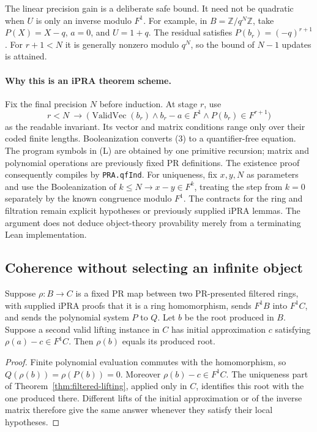 The linear precision gain is a deliberate safe bound.  It need not be
quadratic when $U$ is only an inverse modulo $F^1$.  For example, in
$B=\mathbb Z/q^N\mathbb Z$, take $P(X)=X-q$, $a=0$, and $U=1+q$.
The residual satisfies $P(b_r)=(-q)^{r+1}$.  For $r+1<N$ it is generally
nonzero modulo $q^N$, so the bound of $N-1$ updates is attained.

\paragraph{Why this is an iPRA theorem scheme.}
Fix the final precision $N$ before induction.  At stage $r$, use
\[
 r<N\ \longrightarrow\
 \bigl(\operatorname{ValidVec}(b_r)\wedge
       b_r-a\in F^1\wedge P(b_r)\in F^{r+1}\bigr)
                                                               \tag{3}
\]
as the readable invariant.  Its vector and matrix conditions range only
over their coded finite lengths.  Booleanization converts (3) to a
quantifier-free equation.  The program symbols in (L) are obtained by one
primitive recursion; matrix and polynomial operations are previously fixed
PR definitions.  The existence proof consequently compiles by
\texttt{PRA.qfInd}.  For uniqueness, fix $x,y,N$ as parameters and use the
Booleanization of $k\le N\to x-y\in F^k$, treating the step from
$k=0$ separately by the known congruence modulo $F^1$.
The contracts for the ring and
filtration remain explicit hypotheses or previously supplied iPRA lemmas.
The argument does not deduce object-theory provability merely from a
terminating Lean implementation.

\subsection{Coherence without selecting an infinite object}

\begin{corollary}
\label{cor:filtered-coherence}
Suppose $\rho:B\to C$ is a fixed PR map between two PR-presented
filtered rings, with supplied iPRA proofs that it is a ring homomorphism,
sends $F^1B$ into $F^1C$, and sends the polynomial system
$P$ to $Q$.  Let $b$ be the root produced in $B$.  Suppose a second valid
lifting instance in $C$ has initial approximation $c$ satisfying
$\rho(a)-c\in F^1C$.  Then $\rho(b)$ equals its produced root.
\end{corollary}

\begin{proof}
Finite polynomial evaluation commutes with the homomorphism, so
$Q(\rho(b))=\rho(P(b))=0$.  Moreover $\rho(b)-c\in F^1C$.
The uniqueness part of Theorem~\ref{thm:filtered-lifting}, applied only in
$C$, identifies this root with the one produced there.  Different lifts
of the initial approximation or of the inverse matrix therefore give the
same answer whenever they satisfy their local hypotheses.
\end{proof}

